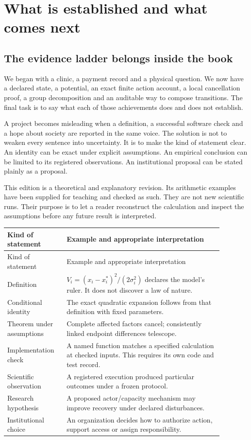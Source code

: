 \chapter{What is established and what comes next}\label{ch:claims}

\section{The evidence ladder belongs inside the book}
We began with a clinic, a payment record and a physical question. We now have a declared state, a potential, an exact finite action account, a local cancellation proof, a group decomposition and an auditable way to compose transitions. The final task is to say what each of those achievements does and does not establish.

A project becomes misleading when a definition, a successful software check and a hope about society are reported in the same voice. The solution is not to weaken every sentence into uncertainty. It is to make the kind of statement clear. An identity can be exact under explicit assumptions. An empirical conclusion can be limited to its registered observations. An institutional proposal can be stated plainly as a proposal.

This edition is a theoretical and explanatory revision. Its arithmetic examples have been supplied for teaching and checked as such. They are not new scientific runs. Their purpose is to let a reader reconstruct the calculation and inspect the assumptions before any future result is interpreted.

\begin{center}\small
\begin{longtable}{P{0.23\linewidth}P{0.65\linewidth}}\toprule
Kind of statement & Example and appropriate interpretation\\\midrule
\endfirsthead
\toprule Kind of statement & Example and appropriate interpretation\\\midrule
\endhead
Definition & $V_i=(x_i-x_i^*)^2/(2\sigma_i^2)$ declares the model's ruler. It does not discover a law of nature.\\
Conditional identity & The exact quadratic expansion follows from that definition with fixed parameters.\\
Theorem under assumptions & Complete affected factors cancel; consistently linked endpoint differences telescope.\\
Implementation check & A named function matches a specified calculation at checked inputs. This requires its own code and test record.\\
Scientific observation & A registered execution produced particular outcomes under a frozen protocol.\\
Research hypothesis & A proposed actor/capacity mechanism may improve recovery under declared disturbances.\\
Institutional choice & An organization decides how to authorize action, support access or assign responsibility.\\\bottomrule
\end{longtable}
\end{center}

